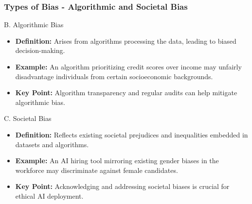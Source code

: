\documentclass[aspectratio=169]{beamer}
\begin{document}
\begin{frame}[fragile]
    \frametitle{Types of Bias - Algorithmic and Societal Bias}
    
    \begin{block}{B. Algorithmic Bias}
        \begin{itemize}
            \item \textbf{Definition:} Arises from algorithms processing the data, leading to biased decision-making.
            \item \textbf{Example:} An algorithm prioritizing credit scores over income may unfairly disadvantage individuals from certain socioeconomic backgrounds.
            \item \textbf{Key Point:} Algorithm transparency and regular audits can help mitigate algorithmic bias.
        \end{itemize}
    \end{block}
    
    \begin{block}{C. Societal Bias}
        \begin{itemize}
            \item \textbf{Definition:} Reflects existing societal prejudices and inequalities embedded in datasets and algorithms.
            \item \textbf{Example:} An AI hiring tool mirroring existing gender biases in the workforce may discriminate against female candidates.
            \item \textbf{Key Point:} Acknowledging and addressing societal biases is crucial for ethical AI deployment.
        \end{itemize}
    \end{block}
\end{frame}
\end{document}
